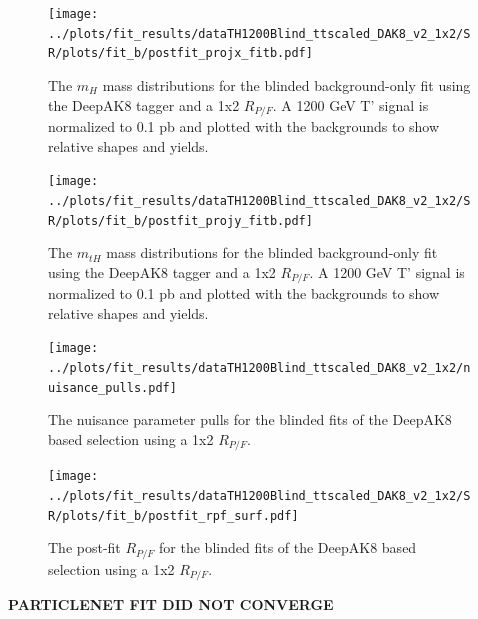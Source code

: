 \documentclass[10pt,oneside]{article}
\begin{document}
\begin{figure}[H]
    \centering
    \texttt{[image: ../plots/fit\_results/dataTH1200Blind\_ttscaled\_DAK8\_v2\_1x2/SR/plots/fit\_b/postfit\_projx\_fitb.pdf]}
    \caption{The $m_H$ mass distributions for the blinded background-only fit using the DeepAK8 tagger and a 1x2 $R_{P/F}$.
    A 1200 GeV T' signal is normalized to 0.1 pb and plotted with the backgrounds to show relative shapes and yields.}
    \label{figs:DAK8_mh_1x2}
\end{figure}
\begin{figure}[H]
    \centering
    \texttt{[image: ../plots/fit\_results/dataTH1200Blind\_ttscaled\_DAK8\_v2\_1x2/SR/plots/fit\_b/postfit\_projy\_fitb.pdf]}
    \caption{The $m_{tH}$ mass distributions for the blinded background-only fit using the DeepAK8 tagger and a 1x2 $R_{P/F}$.
    A 1200 GeV T' signal is normalized to 0.1 pb and plotted with the backgrounds to show relative shapes and yields.}
    \label{figs:DAK8_mth_1x2}
\end{figure}
\begin{figure}[H]
    \centering
    \texttt{[image: ../plots/fit\_results/dataTH1200Blind\_ttscaled\_DAK8\_v2\_1x2/nuisance\_pulls.pdf]}
    \caption{The nuisance parameter pulls for the blinded fits of the DeepAK8 based selection using a 1x2 $R_{P/F}$.}
    \label{figs:DAK8_nuis_1x2}
\end{figure}
\begin{figure}[H]
    \centering
    \texttt{[image: ../plots/fit\_results/dataTH1200Blind\_ttscaled\_DAK8\_v2\_1x2/SR/plots/fit\_b/postfit\_rpf\_surf.pdf]}
    \caption{The post-fit $R_{P/F}$ for the blinded fits of the DeepAK8 based selection using a 1x2 $R_{P/F}$.}
    \label{figs:DAK8_rpf_1x2}
\end{figure}

\textbf{PARTICLENET FIT DID NOT CONVERGE}
\end{document}

